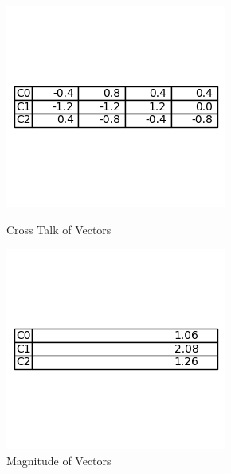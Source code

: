 \documentclass[12pt]{article}
\begin{document}
\begin{figure}[ht]
    \centering
    \begin{minipage}{0.45\textwidth}
        \centering
        \includegraphics[width=\linewidth]{CrossTalk.png}
        \caption{Cross Talk of Vectors}
        \label{fig:crosstalk}
    \end{minipage}\hfill
    \begin{minipage}{0.45\textwidth}
        \centering
        \includegraphics[width=\linewidth]{magnitude.png}
        \caption{Magnitude of Vectors}
        \label{fig:magnitude}
    \end{minipage}
\end{figure}
\end{document}
